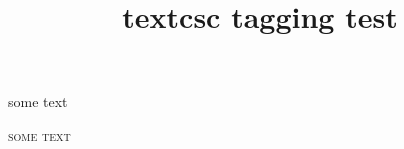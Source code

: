 \documentclass{article}
\title{textcsc tagging test}
\begin{document}
some text

\textsc{some text}

\end{document}
